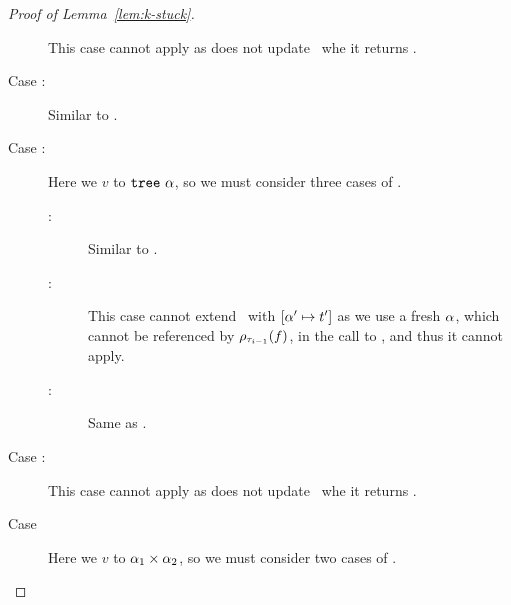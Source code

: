 \begin{proof}[Proof of Lemma~\ref{lem:k-stuck}]
\begin{description}
      This case cannot apply as \forcesym does not update \tsu\ whe
      it returns \stuck.
    \item[Case \renodebadtwo:]
      Similar to \renodegood.
    \item[Case \rulename{E-Case-Good\{1,2\}}:]
      Here we \forcesym $v$ to $\mathtt{tree}\ \alpha$,
      so we must consider three cases of \forcesym.
      \begin{description}
      \item[:]
        Similar to \replusgood.
      \item[:]
        This case cannot extend \tsu\ with $[\alpha' \mapsto t']$ as we
        use a fresh $\alpha$, which cannot be referenced by
        $\rho_{\tau_{i-1}}(f)$, in the call to \forcesym, and thus it
        cannot apply.
      \item[:]
        Same as .
      \end{description}
    \item[Case \recasebad:]
      This case cannot apply as \forcesym does not update \tsu\ whe
      it returns \stuck.
    \item[Case \repcasegood]
      Here we \forcesym $v$ to $\alpha_1 \times \alpha_2$,
      so we must consider two cases of \forcesym.
      \begin{description}

\end{description}
\end{description}
\end{proof}
